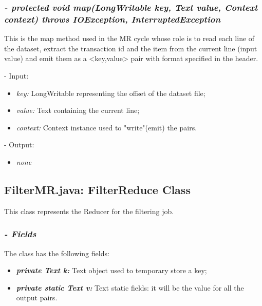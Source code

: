 \documentclass[]{report}
\begin{document}
	\subsubsection*{\textit{\textbf{-} protected void map(LongWritable key, Text value, Context context) throws IOException, InterruptedException}}   	
	This is the map method used in the MR cycle whose role is to read each line of the dataset, extract the transaction id and the item from the current line (input value) and emit them as a <key,value> pair with format specified in the header.  
	\begin{description}
		\item - Input:
		\begin{itemize}
			\item \textit{key:} LongWritable representing the offset of the dataset file;
			\item \textit{value:} Text containing the current line;
			\item \textit{context:} Context instance used to "write"(emit) the pairs.
		\end{itemize}
	\end{description}
	\begin{description}
		\item - Output:
		\begin{itemize}
			\item \textit{none} 
		\end{itemize}
	\end{description}
	
	\subsection*{FilterMR.java: FilterReduce Class}
	This class represents the Reducer for the filtering job.
	\subsubsection*{\textit{\textbf{-} Fields}} 
	The class has the following fields:
	\begin{itemize}
		\item \textit{\textbf{private Text k:}} Text object used to temporary store a key;
		\item \textit{\textbf{private static Text v:}} Text static fields: it will be the value for all the output pairs.
	\end{itemize}
	
\end{document}

